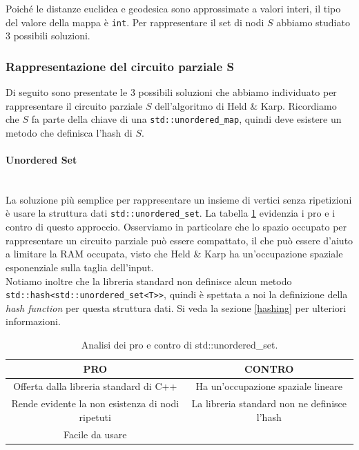 \noindent Poiché le distanze euclidea e geodesica sono approssimate a valori interi, il tipo del valore della mappa è \texttt{int}.
Per rappresentare il set di nodi $S$ abbiamo studiato 3 possibili soluzioni.

\subsubsection{Rappresentazione del circuito parziale S}
\label{held-karp-S-repr}

Di seguito sono presentate le 3 possibili soluzioni che abbiamo individuato per rappresentare il circuito parziale $S$ dell'algoritmo di Held \& Karp. Ricordiamo che $S$ fa parte della chiave di una \texttt{std::unordered_map}, quindi deve esistere un metodo che definisca l'hash di $S$.

\paragraph{Unordered Set}\mbox{}\\

\noindent La soluzione più semplice per rappresentare un insieme di vertici senza ripetizioni è usare la struttura dati \texttt{std::unordered_set}. La tabella \ref{tab:pro-cons-unordered-set} evidenzia i pro e i contro di questo approccio. Osserviamo in particolare che lo spazio occupato per rappresentare un circuito parziale può essere compattato, il che può essere d'aiuto a limitare la RAM occupata, visto che Held \& Karp ha un'occupazione spaziale esponenziale sulla taglia dell'input. \\

\noindent Notiamo inoltre che la libreria standard non definisce alcun metodo \\ \texttt{std::hash<std::unordered_set<T>>}, quindi è spettata a noi la definizione della \textit{hash function} per questa struttura dati. Si veda la sezione \ref{hashing} per ulteriori informazioni.

\begin{table}[h]
  \centering
    \begin{tabular}{|c | c|}
    \hline
    \textbf{PRO} & \textbf{CONTRO} \\ [0.5ex]
    \hline\hline
    Offerta dalla libreria standard di C++ & Ha un'occupazione spaziale lineare\\
    \hline
    Rende evidente la non esistenza di nodi ripetuti & La libreria standard non ne definisce l'hash \\
    \hline
    Facile da usare &  \\
    \hline
  \end{tabular}
    \caption{Analisi dei pro e contro di std::unordered\_set.}
    \label{tab:pro-cons-unordered-set}
\end{table}

